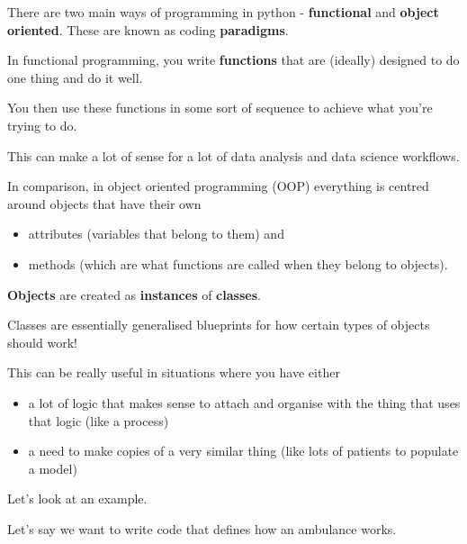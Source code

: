 \documentclass[
  letterpaper,
  DIV=11,
  numbers=noendperiod]{scrreprt}
\providecommand{\tightlist}{%
  \setlength{\itemsep}{0pt}\setlength{\parskip}{0pt}}\usepackage{longtable,booktabs,array}
\begin{document}
\begin{tcolorbox}[enhanced jigsaw, colframe=quarto-callout-note-color-frame, bottomtitle=1mm, breakable, rightrule=.15mm, coltitle=black, colbacktitle=quarto-callout-note-color!10!white, opacityback=0, leftrule=.75mm, arc=.35mm, toptitle=1mm, title=\textcolor{quarto-callout-note-color}{\faInfo}\hspace{0.5em}{Note}, titlerule=0mm, colback=white, toprule=.15mm, bottomrule=.15mm, left=2mm, opacitybacktitle=0.6]

There are two main ways of programming in python - \textbf{functional}
and \textbf{object oriented}. These are known as coding
\textbf{paradigms}.

In functional programming, you write \textbf{functions} that are
(ideally) designed to do one thing and do it well.

You then use these functions in some sort of sequence to achieve what
you're trying to do.

This can make a lot of sense for a lot of data analysis and data science
workflows.

In comparison, in object oriented programming (OOP) everything is
centred around objects that have their own

\begin{itemize}
\tightlist
\item
  attributes (variables that belong to them) and
\item
  methods (which are what functions are called when they belong to
  objects).
\end{itemize}

\textbf{Objects} are created as \textbf{instances} of \textbf{classes}.

Classes are essentially generalised blueprints for how certain types of
objects should work!

This can be really useful in situations where you have either

\begin{itemize}
\tightlist
\item
  a lot of logic that makes sense to attach and organise with the thing
  that uses that logic (like a process)
\item
  a need to make copies of a very similar thing (like lots of patients
  to populate a model)
\end{itemize}

Let's look at an example.

Let's say we want to write code that defines how an ambulance works.


\end{tcolorbox}
\end{document}
